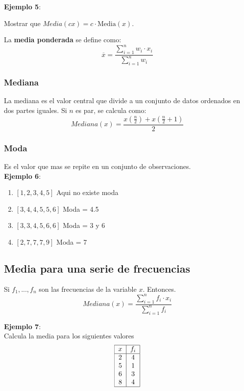 \documentclass{article}
\begin{document}
\textbf{Ejemplo 5}:

Mostrar que $Media(cx) = c \cdot \text{Media}(x)$.

La \textbf{media ponderada} se define como:
\[
    \overline{x} = \frac{\sum_{i=1}^{n} w_i \cdot x_i}{\sum_{i=1}^{n} w_i}
\]

\subsubsection{Mediana}

\noindent La mediana es el valor central que divide a un conjunto de datos ordenados en dos partes iguales. Si $n$ es par, se calcula como:
\[
    Mediana(x) = \frac{x(\frac{n}{2}) + x(\frac{n}{2} + 1)}{2}
\]


\subsubsection{Moda}

\noindent Es el valor que mas se repite en un conjunto  de observaciones. \\
\textbf{Ejemplo 6}:

\begin{enumerate}
    \item $[1,2,3,4,5]$ Aqui no existe moda
    \item $[3,4,4,5,5,6]$ Moda = 4.5
    \item $[3,3,4,5,6,6]$ Moda = 3 y 6
    \item $[2,7,7,7,9]$ Moda = 7
\end{enumerate}

\subsection{Media para una serie de frecuencias}

Si $f_1, ... , f_n$ son las frecuencias de la variable $x$. Entonces.
\[
    Mediana(x) = \frac{\sum^{n}_{i=1}f_i \cdot x_i}{\sum^{n}_{i=1}f_i}
\]


\textbf{Ejemplo 7}: \\
Calcula la media para los siguientes valores
\[
    \begin{tabular}{|c|c|}
        \hline
        $x$ & $f_i$ \\
        \hline
        2   & 4     \\
        5   & 1     \\
        6   & 3     \\
        8   & 4     \\
        \hline
    \end{tabular}
\]
\end{document}

